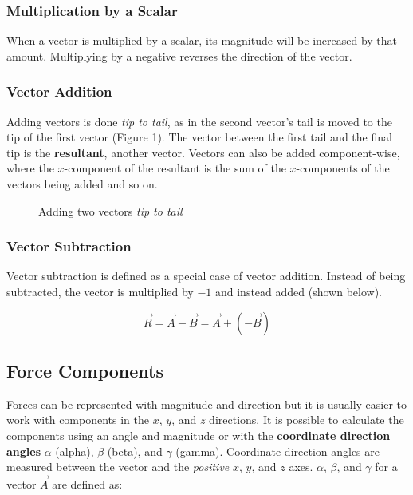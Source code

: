\documentclass[12pt]{article}
\begin{document}
\subsubsection*{Multiplication by a Scalar}
When a vector is multiplied by a scalar, its magnitude will be increased by that amount. 
Multiplying by a negative reverses the direction of the vector.

\subsubsection*{Vector Addition}
Adding vectors is done \textit{tip to tail}, as in the second vector's tail is moved to the tip of the first vector (Figure 1).
The vector between the first tail and the final tip is the \textbf{resultant}, another vector.
Vectors can also be added component-wise, where the $x$-component of the resultant is the sum of the $x$-components of the vectors being added and so on.

\begin{figure}
\centering
{}
\caption{Adding two vectors \textit{tip to tail}}
\end{figure}

\subsubsection*{Vector Subtraction}
Vector subtraction is defined as a special case of vector addition.
Instead of being subtracted, the vector is multiplied by $-1$ and instead added (shown below).

\begin{equation*}
    \vec{R} = \vec{A} - \vec{B} = \vec{A} + \left(-\vec{B}\right)
\end{equation*}

\subsection{Force Components}
Forces can be represented with magnitude and direction but it is usually easier to work with components in the $x$, $y$, and $z$ directions.
It is possible to calculate the components using an angle and magnitude or with the \textbf{coordinate direction angles} $\alpha$ (alpha), $\beta$ (beta), and $\gamma$ (gamma).
Coordinate direction angles are measured between the vector and the \textit{positive} $x$, $y$, and $z$ axes.
$\alpha$, $\beta$, and $\gamma$ for a vector $\vec{A}$ are defined as:
\end{document}
